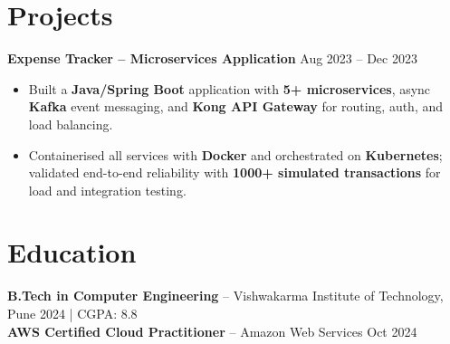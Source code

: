 \documentclass[letterpaper,10pt]{article}
\begin{document}
\section*{Projects}

\textbf{Expense Tracker -- Microservices Application} \hfill Aug 2023 -- Dec 2023
\begin{itemize}[leftmargin=*]
    \item Built a \textbf{Java/Spring Boot} application with \textbf{5+ microservices}, async \textbf{Kafka} event messaging, and \textbf{Kong API Gateway} for routing, auth, and load balancing.
    \item Containerised all services with \textbf{Docker} and orchestrated on \textbf{Kubernetes}; validated end-to-end reliability with \textbf{1000+ simulated transactions} for load and integration testing.
\end{itemize}

\section*{Education}
\textbf{B.Tech in Computer Engineering} -- Vishwakarma Institute of Technology, Pune \hfill 2024 \;|\; CGPA: 8.8 \\
\textbf{AWS Certified Cloud Practitioner} -- Amazon Web Services \hfill Oct 2024
\end{document}
